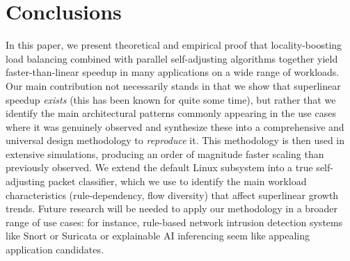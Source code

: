 \section{Conclusions}\label{sec:conclusions}

In this paper, we present theoretical and empirical proof that locality-boosting load balancing combined with parallel self-adjusting algorithms together yield faster-than-linear speedup in many applications on a wide range of workloads. Our main contribution not necessarily stands in that we show that superlinear speedup \emph{exists} (this has been known for quite some time), but rather that we identify the main architectural patterns commonly appearing in the use cases where it was genuinely observed and synthesize these into a comprehensive and universal design methodology to \emph{reproduce} it. This methodology is then used in extensive simulations, producing an order of magnitude faster scaling than previously observed. We extend the default \nftables Linux subsystem into a true self-adjusting packet classifier, which we use to identify the main workload characteristics (rule-dependency, flow diversity) that affect superlinear growth trends.  Future research will be needed to apply our methodology in a broader range of use cases: for instance, rule-based network intrusion detection systems like Snort or Suricata \cite{10.5555/2537857.2537883} or explainable AI inferencing seem like appealing application candidates.


